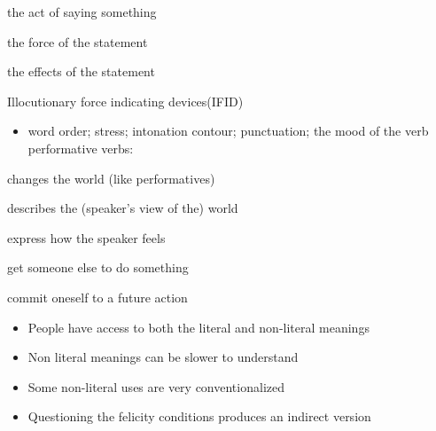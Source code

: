 \documentclass[headrule,footrule]{foils}
\begin{document}
\begin{description}
\item {} the act of saying something
\item {} the force of the statement 
\item {} the effects of the statement
\end{description}
Illocutionary force indicating devices(IFID)
\begin{itemize}
\item   word order;  stress;    intonation contour;  punctuation; the mood of the verb
 performative verbs:  
\end{itemize}

  \begin{description}
  \item {} changes the world (like performatives)
  \item {} describes the (speaker's view of the) world 
  \item {}  express how the speaker feels
  \item {} get someone else to do something
  \item {} commit oneself to a future action
  \end{description}


\begin{exe}
  \ex
  \begin{xlist}
    \ex {}
    \ex {}
  \end{xlist}
  \ex 
  \begin{xlist}
    \ex {}
    \ex {}
  \end{xlist}
  \ex
  \begin{xlist}
    \ex {}
    \ex {}
  \end{xlist}
\end{exe}
\begin{itemize}
\item People have access to both the literal and non-literal meanings
\item Non literal meanings can be slower to understand
\item Some non-literal uses are very conventionalized 
  \\  \into {}
\item Questioning the felicity conditions produces an indirect version
\end{itemize}
\end{document}
